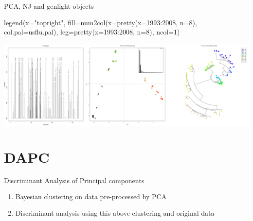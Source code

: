 \documentclass[compress, xelatex, 11pt, xcolor=svgnames, aspectratio=169,
	hyperref={
		bookmarks=true,
		unicode=true,
		colorlinks=true,
		pdftitle={Molecular data in R},
		plainpages=false,
		pdfauthor={Vojtech Zeisek},
		pdfsubject={Course about phylogeny and evolution in R},
		pdfcreator={XeLaTeX},
		pdfkeywords={R, evolution, phylogeny, molecular data},
		linkcolor=Crimson, %
		anchorcolor=Magenta, %
		citecolor=Magenta, %
		filecolor=Magenta, %
		menucolor=Magenta, %
		urlcolor=DodgerBlue, %
		},
	url={hyphens, lowtilde} %
	]{beamer}
\begin{document}
\begin{frame}[fragile]{PCA, NJ and genlight objects}
	\begin{spluscode}
    legend(x="topright", fill=num2col(x=pretty(x=1993:2008, n=8),
      col.pal=usflu.pal), leg=pretty(x=1993:2008, n=8), ncol=1)
	\end{spluscode}
	\begin{center}
		\includegraphics[width=\textwidth]{flu_pcoa_nj.png}
	\end{center}
\end{frame}

\section{DAPC}

\begin{frame}{Discriminant Analysis of Principal components}
	\tableofcontents[currentsection, sectionstyle=show/hide, hideothersubsections]
	\begin{enumerate}
	 \item Bayesian clustering on data pre-processed by PCA
	 \item Discriminant analysis using this above clustering and original data
	\end{enumerate}
\end{frame}
\end{document}

